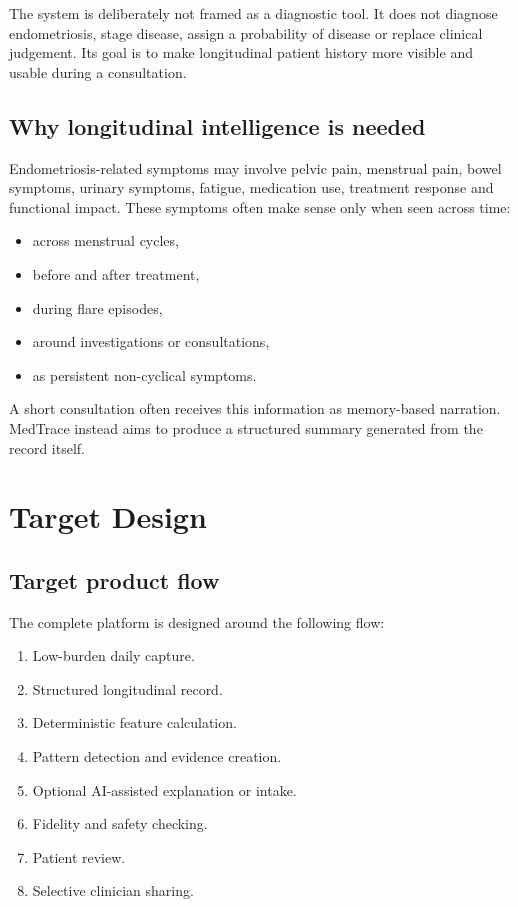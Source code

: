 \documentclass[11pt,a4paper]{article}
\begin{document}
The system is deliberately not framed as a diagnostic tool. It does not diagnose endometriosis, stage disease, assign a probability of disease or replace clinical judgement. Its goal is to make longitudinal patient history more visible and usable during a consultation.

\subsection{Why longitudinal intelligence is needed}

Endometriosis-related symptoms may involve pelvic pain, menstrual pain, bowel symptoms, urinary symptoms, fatigue, medication use, treatment response and functional impact. These symptoms often make sense only when seen across time:

\begin{itemize}
  \item across menstrual cycles,
  \item before and after treatment,
  \item during flare episodes,
  \item around investigations or consultations,
  \item as persistent non-cyclical symptoms.
\end{itemize}

A short consultation often receives this information as memory-based narration. MedTrace instead aims to produce a structured summary generated from the record itself.

\section{Target Design}

\subsection{Target product flow}

The complete platform is designed around the following flow:

\begin{enumerate}
  \item Low-burden daily capture.
  \item Structured longitudinal record.
  \item Deterministic feature calculation.
  \item Pattern detection and evidence creation.
  \item Optional AI-assisted explanation or intake.
  \item Fidelity and safety checking.
  \item Patient review.
  \item Selective clinician sharing.
\end{enumerate}
\end{document}
